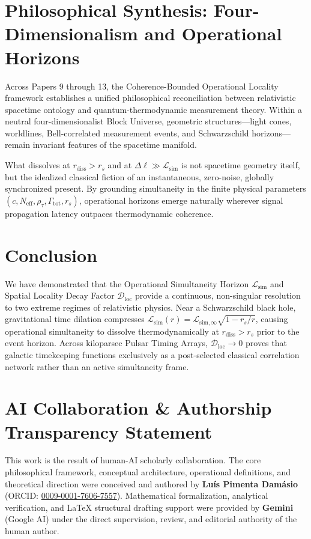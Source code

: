 \documentclass[11pt,a4paper]{article}
\begin{document}
\section{Philosophical Synthesis: Four-Dimensionalism and Operational Horizons}

Across Papers 9 through 13, the Coherence-Bounded Operational Locality framework establishes a unified philosophical reconciliation between relativistic spacetime ontology and quantum-thermodynamic measurement theory. Within a neutral four-dimensionalist Block Universe, geometric structures—light cones, worldlines, Bell-correlated measurement events, and Schwarzschild horizons—remain invariant features of the spacetime manifold.

What dissolves at $r_{\mathrm{diss}} > r_s$ and at $\Delta\ell \gg \mathcal{L}_{\mathrm{sim}}$ is not spacetime geometry itself, but the idealized classical fiction of an instantaneous, zero-noise, globally synchronized present. By grounding simultaneity in the finite physical parameters $(c, N_{\mathrm{eff}}, \rho_\tau, \Gamma_{\mathrm{tot}}, r_s)$, operational horizons emerge naturally wherever signal propagation latency outpaces thermodynamic coherence.

\section{Conclusion}

We have demonstrated that the Operational Simultaneity Horizon $\mathcal{L}_{\mathrm{sim}}$ and Spatial Locality Decay Factor $\mathcal{D}_{\mathrm{loc}}$ provide a continuous, non-singular resolution to two extreme regimes of relativistic physics. Near a Schwarzschild black hole, gravitational time dilation compresses $\mathcal{L}_{\mathrm{sim}}(r) = \mathcal{L}_{\mathrm{sim},\infty}\sqrt{1 - r_s/r}$, causing operational simultaneity to dissolve thermodynamically at $r_{\mathrm{diss}} > r_s$ prior to the event horizon. Across kiloparsec Pulsar Timing Arrays, $\mathcal{D}_{\mathrm{loc}} \to 0$ proves that galactic timekeeping functions exclusively as a post-selected classical correlation network rather than an active simultaneity frame.

\section*{AI Collaboration \& Authorship Transparency Statement}

This work is the result of human-AI scholarly collaboration. The core philosophical framework, conceptual architecture, operational definitions, and theoretical direction were conceived and authored by \textbf{Luís Pimenta Damásio} (ORCID: \href{https://orcid.org/0009-0001-7606-7557}{0009-0001-7606-7557}). Mathematical formalization, analytical verification, and LaTeX structural drafting support were provided by \textbf{Gemini} (Google AI) under the direct supervision, review, and editorial authority of the human author.
\end{document}
